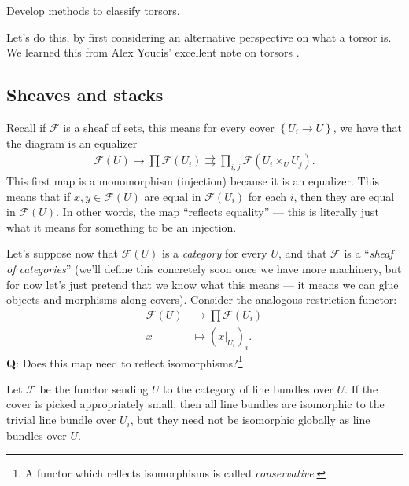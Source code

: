 \documentclass[11pt,openany]{book}
\begin{document}
\begin{goal} Develop methods to classify torsors.
\end{goal}





Let's do this, by first considering an alternative perspective on what a torsor is. We learned this from Alex Youcis' excellent note on torsors \cite{Youcis}.

\subsection{Sheaves and stacks}

Recall if $\mathscr{F}$ is a sheaf of sets, this means for every cover $\left\{ U_i \to U \right\}$, we have that the diagram is an equalizer
\begin{align*}
    \mathcal{F}(U) \to \prod \mathcal{F}(U_i) \rightrightarrows \prod_{i,j} \mathcal{F}(U_i \times_U U_j).
\end{align*}
This first map is a monomorphism (injection) because it is an equalizer. This means that if $x,y \in \mathcal{F}(U)$ are equal in $\mathcal{F}(U_i)$ for each $i$, then they are equal in $\mathcal{F}(U)$. In other words, the map ``reflects equality'' --- this is literally just what it means for something to be an injection.

Let's suppose now that $\mathcal{F}(U)$ is a \textit{category} for every $U$, and that $\mathcal{F}$ is a ``\textit{sheaf of categories}'' (we'll define this concretely soon once we have more machinery, but for now let's just pretend that we know what this means --- it means we can glue objects and morphisms along covers). Consider the analogous restriction functor:
\begin{align*}
    \mathcal{F}(U) &\to \prod \mathcal{F}(U_i) \\
    x &\mapsto \left( x|_{U_i} \right)_i.
\end{align*}
%
\textbf{Q}: Does this map need to reflect isomorphisms?\footnote{A functor which reflects isomorphisms is called \textit{conservative}.}

\begin{example} Let $\mathcal{F}$ be the functor sending $U$ to the category of line bundles over $U$. If the cover is picked appropriately small, then all line bundles are isomorphic to the trivial line bundle over $U_i$, but they need not be isomorphic globally as line bundles over $U$.
\end{example}
\end{document}
